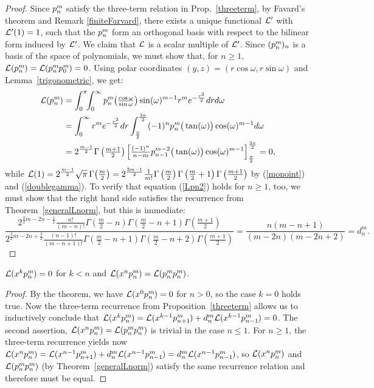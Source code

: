 \begin{proof}
Since $p_{n}^{m}\;\!\!$ satisfy the three-term relation in Prop.~\ref{threeterm}, by Favard's theorem and Remark \ref{finiteFarvard}, there exists a unique functional $\mathcal{L}'$ with $\mathcal{L}'(1)=1$, such that the $p_{n}^{m}\;\!\!$ form an orthogonal basis with respect to the bilinear form induced by $\mathcal{L}'$. We claim that $\mathcal{L}$ is a scalar multiple of $\mathcal{L}'$.
Since $(p_{n}^{m}\;\!\!)_{n} $ is a basis of the space of polynomials, we must show that, for $n\geq 1$, $\mathcal{L}(p_{n}^{m}\;\!\!) = \mathcal{L}(p_{n}^{m}\;\!\!p_{0}^{m}\;\!\!) =0$.
Using polar coordinates $(y,z) = (r\cos\omega,r\sin\omega)$ and Lemma~\ref{trigonometric}, we get:
\begin{align*}
\L(\pol{n}{m}) &= \int_0^\pi\!\!\int_0^\infty\pol{n}{m}\!\left(\tfrac{\cos\omega}{\sin\omega}\right)\sin(\omega)^{m-1} r^m e^{-\frac{r^2}{2}}dr d\omega \\
&=\int_0^\infty r^m e^{-\frac{r^2}{2}}dr \int_{\frac{\pi}{2}}^{\frac{3\pi}{2}} (-1)^n \pol{n}{m}\big(\tan(\omega)\big)\cos(\omega)^{m-1}d\omega\\
&= 2^{\frac{m-1}{2}}\Gamma\left(\tfrac{m+1}{2}\right)\Big[\tfrac{(-1)^n}{n-m}p_{n-1}^{m-2}\big(\tan(\omega)\big)\cos(\omega)^{m-1} \Big]_{\frac{\pi}{2}}^{\frac{3\pi}{2}} =0,
\end{align*}
while $\mathcal{L}(1) = 2^{\frac{m-1}{2}}\sqrt{\pi}\,\Gamma\!\left(\frac{m}{2}\right)=2^{\frac{3m-1}{2}}  \frac{1}{m!}
\Gamma\left(\frac{m}{2}\right)\Gamma\left(\frac{m}{2}+1\right)\Gamma\left(\frac{m+1}{2}\right)$ by (\ref{monoint}) and (\ref{doublegamma}). To verify that equation (\ref{Lpn2}) holds for $n\geq 1$, too, we must show that the right hand side satisfies the recurrence from Theorem~\ref{generalLnorm}, but this is immediate:
$$ 
\frac{2^{\frac{3}{2}m\!-\!2n\!-\!\frac{1}{2}}  \frac{n!}{(m\!-\!n)!}
\Gamma\!\left(\frac{m}{2}\!-\!n\right)\Gamma\!\left(\frac{m}{2}\!-\!n\!+\!1\right)\Gamma\!\left(\frac{m+1}{2}\right)}{
2^{\frac{3}{2}m\!-\!2n\!+\!\frac{3}{2}}  \frac{(n\!-\!1)!}{(m\!-\!n\!+\!1)!}
\Gamma\!\left(\frac{m}{2}\!-\!n\!+\!1\right)\Gamma\!\left(\frac{m}{2}\!-\!n\!+\!2\right)\Gamma\!\left(\frac{m+1}{2}\right)} = \frac{n(m\!-\!n\!+\!1)}{(m\!-\!2n)(m\!-\!2n\!+\!2)} =d_n^m.
$$
\end{proof}
\begin{corollary} \label{pcor}
 $\mathcal{L}(x^{k}p_{n}^{m}\;\!\!) = 0$ for $k < n$ and $\mathcal{L}(x^np_{n}^{m}\;\!\!)= \mathcal{L}(p_{n}^{m}\;\!\!p_{n}^{m}\;\!\!)$.
\end{corollary}
\begin{proof} By the theorem, we have $\mathcal{L}(x^{0}p_{n}^{m}\;\!\!) = 0$ for $n>0$, so the case $k=0$ holds true.
Now the three-term recurrence from Proposition~\ref{threeterm} allows us to inductively conclude that $\mathcal{L}(x^kp_{n}^{m}\;\!\!) = \mathcal{L}(x^{k-1}p_{n+1}^{m}\;\!\!)+d_n^m\mathcal{L}(x^{k-1}p_{n-1}^{m}\;\!\!) =0$.
The second assertion, $\mathcal{L}(x^np_{n}^{m}\;\!\!)= \mathcal{L}(p_{n}^{m}\;\!\!p_{n}^{m}\;\!\!)$ is trivial in the case $n\leq 1$. For $n\geq 1$, the three-term recurrence yields now $\L(x^n\pol{n}{m}) = \L(x^{n-1}\pol{n+1}{m})+d_n^m\L(x^{n-1}\pol{n-1}{m})=d_n^m\L(x^{n-1}\pol{n-1}{m})$, so $\mathcal{L}(x^np_{n}^{m}\;\!\!)$ and $\mathcal{L}(p_{n}^{m}\;\!\!p_{n}^{m}\;\!\!)$ (by Theorem~\ref{generalLnorm}) satisfy the same recurrence relation and therefore must be equal.
\end{proof}



